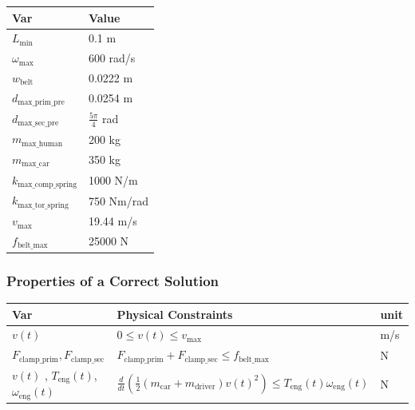 \documentclass[12pt]{article}
\begin{document}
\noindent

\begin{table}[H]
\caption{Specification Parameter Values} \label{TblSpecParams}
\renewcommand{\arraystretch}{1.2}
\noindent \begin{longtable*}{l l} 
  \toprule
  \textbf{Var} & \textbf{Value} \\
  \midrule 
  $L_\text{min}$ & 0.1 \si{\metre}\\
  $\omega_\text{max}$ & 600 rad/s\\
  $w_\text{belt}$ & 0.0222 m\\
  $d_\text{max\_prim\_pre}$ & 0.0254 m\\
  $d_\text{max\_sec\_pre}$ & $\frac{5\pi}{4}$ rad\\
  $m_\text{max\_human}$ & 200 kg\\
  $m_\text{max\_car}$ & 350 kg\\
  $k_\text{max\_comp\_spring}$ & 1000 N/m\\
  $k_\text{max\_tor\_spring}$ & 750 Nm/rad\\
  $v_\text{max}$ & 19.44 m/s\\
  $f_\text{belt\_max}$ & 25000 N\\
  \bottomrule
\end{longtable*}
\end{table}

\subsubsection{Properties of a Correct Solution} \label{sec_CorrectSolution}

\noindent

\begin{table}[H]
\caption{Output Variables} \label{TblOutputVar}
\renewcommand{\arraystretch}{1.2}
\noindent \begin{longtable*}{l l l} 
  \toprule
  \textbf{Var} & \textbf{Physical Constraints} & \textbf{unit}\\
  \midrule 
  $v(t)$ & $0 \leq v(t) \leq v_\text{max}$& m/s\\
  $F_{\text{clamp\_prim}}, F_{\text{clamp\_sec}}$ & $F_{\text{clamp\_prim}} + F_{\text{clamp\_sec}} \leq f_\text{belt\_max}$ & N \\
  $v(t)$ , $T_\text{eng}(t)$,  $\omega_\text{eng}(t)$ & $\frac{d}{dt}(\frac{1}{2}(m_\text{car}+m_\text{driver})v(t)^2) \leq T_\text{eng}(t) \omega_\text{eng}(t)$ & N\\
  \bottomrule
\end{longtable*}
\end{table}
\end{document}

